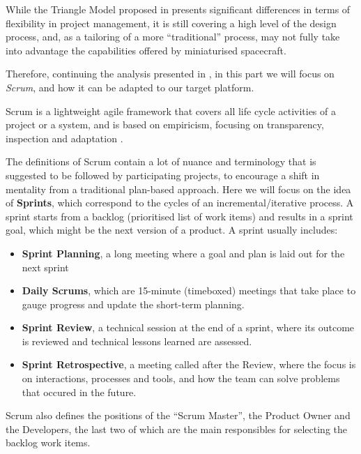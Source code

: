 \documentclass[]{iac}
\def\todo#1{}
\begin{document}
While the Triangle Model proposed in  presents significant differences in terms of flexibility in project management, it is still covering a high level of the design process, and, as a tailoring of a more ``traditional'' process, may not fully take into advantage the capabilities offered by miniaturised spacecraft.

Therefore, continuing the analysis presented in , in this part we will focus on \emph{Scrum}, and how it can be adapted to our target platform.

Scrum is a lightweight agile framework that covers all life cycle activities of a project or a system, and is based on empiricism, focusing on transparency, inspection and adaptation \autocite{schwaver_definitive_2020,bott_analysis_2019}.


The definitions of Scrum \autocite{schwaver_definitive_2020} contain a lot of nuance and terminology that is suggested to be followed by participating projects, to encourage a shift in mentality from a traditional plan-based approach. Here we will focus on the idea of \textbf{Sprints}, which correspond to the cycles of an incremental/iterative process. A sprint starts from a backlog (prioritised list of work items) and results in a sprint goal, which might be the next version of a product.
A sprint usually includes:
\begin{itemize}[itemsep=0pt]
    \item \textbf{Sprint Planning}, a long meeting where a goal and plan is laid out for the next sprint
    \item \textbf{Daily Scrums}, which are 15-minute (timeboxed) meetings that take place to gauge progress and update the short-term planning.
    \item \textbf{Sprint Review}, a technical session at the end of a sprint, where its outcome is reviewed and technical lessons learned are assessed.
    \item \textbf{Sprint Retrospective}, a meeting called after the Review, where the focus is on interactions, processes and tools, and how the team can solve problems that occured in the future.
\end{itemize}

Scrum also defines the positions of the ``Scrum Master'', the Product Owner and the Developers, the last two of which are the main responsibles for selecting the backlog work items.
\end{document}
